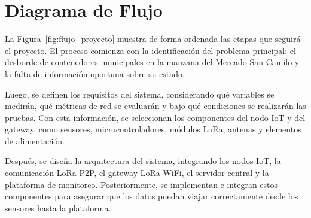 \section{Diagrama de Flujo}
La Figura~\ref{fig:flujo_proyecto} muestra de forma ordenada las etapas que seguirá el proyecto. El proceso comienza con la identificación del problema principal: el desborde de contenedores municipales en la manzana del Mercado San Camilo y la falta de información oportuna sobre su estado.

Luego, se definen los requisitos del sistema, considerando qué variables se medirán, qué métricas de red se evaluarán y bajo qué condiciones se realizarán las pruebas. Con esta información, se seleccionan los componentes del nodo IoT y del gateway, como sensores, microcontroladores, módulos LoRa, antenas y elementos de alimentación.

Después, se diseña la arquitectura del sistema, integrando los nodos IoT, la comunicación LoRa P2P, el gateway LoRa-WiFi, el servidor central y la plataforma de monitoreo. Posteriormente, se implementan e integran estos componentes para asegurar que los datos puedan viajar correctamente desde los sensores hasta la plataforma.

